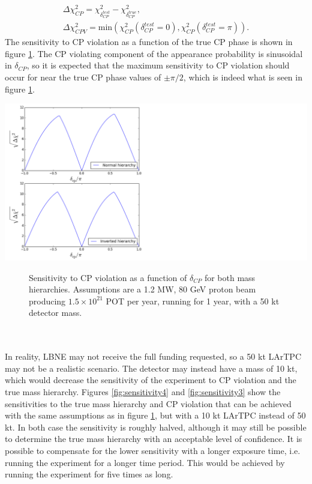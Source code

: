 \documentclass[12pt]{article}
\begin{document}
\begin{align}
\Delta \chi^2_{CP}=\chi_{\delta_{CP}^{test}}^{2}-\chi_{\delta_{CP}^{true}}^{2},\\
\Delta \chi^2_{CPV}=\text{min}(\chi^2_{CP}(\delta_{CP}^{test}=0),\chi^2_{CP}(\delta_{CP}^{test}=\pi)).
\end{align}
The sensitivity to CP violation as a function of the true CP phase is shown in figure \ref{fig:sensitivity2}. The CP violating component of the appearance probability is sinusoidal in $\delta_{CP}$, so it is expected that the maximum sensitivity to CP violation should occur for near the true CP phase values of $\pm\pi/2$, which is indeed what is seen in figure \ref{fig:sensitivity2}.
\begin{center}
\includegraphics[scale=0.9]{CPV_sensitivity.png}
\begin{figure}[h!]
\caption{Sensitivity to CP violation as a function of $\delta_{CP}$ for both mass hierarchies. Assumptions are a 1.2 MW, 80 GeV proton beam producing $1.5\times 10^{21}$ POT per year, running for 1 year, with a 50 kt detector mass.}
\label{fig:sensitivity2}
\end{figure}
\end{center}\\\\
In reality, LBNE may not receive the full funding requested, so a 50 kt LArTPC may not be a realistic scenario. The detector may instead have a mass of 10 kt, which would decrease the sensitivity of the experiment to CP violation and the true mass hierarchy. Figures \ref{fig:sensitivity4} and  \ref{fig:sensitivity3} show the sensitivities to the true mass hierarchy and CP violation that can be achieved with the same assumptions as in figure \ref{fig:sensitivity2}, but with a 10 kt LArTPC instead of 50 kt. In both case the sensitivity is roughly halved, although it may still be possible to determine the true mass hierarchy with an acceptable level of confidence. It is possible to compensate for the lower sensitivity with a longer exposure time, i.e. running the experiment for a longer time period. This would be achieved by running the experiment for five times as long.
\end{document}

